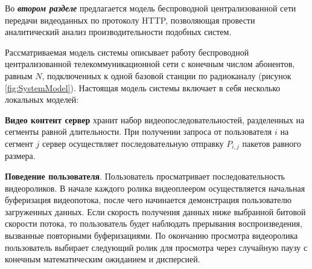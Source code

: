 

Во \textbf{\textit{втором разделе}} предлагается модель беспроводной централизованной сети передачи видеоданных по протоколу HTTP, позволяющая провести аналитический анализ производительности подобных систем.

Рассматриваемая модель системы описывает работу беспроводной централизованной телекоммуникационной сети с конечным числом абонентов, равным $N$, подключенных к одной базовой станции по радиоканалу (рисунок \ref{fig:SystemModel}). Настоящая модель системы включает в себя несколько локальных моделей:

\textbf{Видео контент сервер} хранит набор видеопоследовательностей, разделенных на сегменты равной длительности. При получении запроса от пользователя $i$ на сегмент $j$ сервер осуществляет последовательную отправку $P_{i,j}$ пакетов равного размера.

\textbf{Поведение пользователя}. Пользователь просматривает последовательность видеороликов. В начале каждого ролика видеоплеером осуществляется начальная буферизация видеопотока, после чего начинается демонстрация пользователю загруженных данных. Если скорость получения данных ниже выбранной битовой скорости потока, то пользователь будет наблюдать прерывания воспроизведения, вызванные повторными буферизациями. По окончанию просмотра видеоролика пользователь выбирает следующий ролик для просмотра через случайную паузу с конечным математическим ожиданием и дисперсией.

